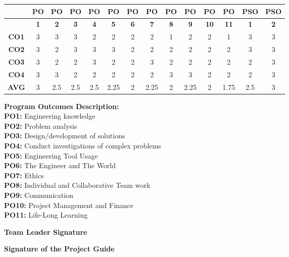 \documentclass[12pt,a4paper]{report}
\begin{document}
\clearpage
\thispagestyle{mainstyle}


\vspace{0.45cm}
\begin{center}
\renewcommand{\arraystretch}{1.25}
\setlength{\tabcolsep}{5pt}
\begin{tabular}{|c|*{11}{c|}c|c|}
\hline
 & \textbf{PO} & \textbf{PO} & \textbf{PO} & \textbf{PO} & \textbf{PO} & \textbf{PO} & \textbf{PO} & \textbf{PO} & \textbf{PO} & \textbf{PO} & \textbf{PO} & \textbf{PSO} & \textbf{PSO} \\
\hline
 & \textbf{1} & \textbf{2} & \textbf{3} & \textbf{4} & \textbf{5} & \textbf{6} & \textbf{7} & \textbf{8} & \textbf{9} & \textbf{10} & \textbf{11} & \textbf{1} & \textbf{2} \\
\hline
\textbf{CO1} & 3 & 3 & 3 & 2 & 2 & 2 & 2 & 1 & 2 & 2 & 1 & 3 & 3 \\
\hline
\textbf{CO2} & 3 & 2 & 3 & 3 & 3 & 2 & 2 & 2 & 2 & 2 & 2 & 3 & 3 \\
\hline
\textbf{CO3} & 3 & 2 & 2 & 3 & 2 & 2 & 3 & 2 & 2 & 2 & 2 & 2 & 3 \\
\hline
\textbf{CO4} & 3 & 3 & 2 & 2 & 2 & 2 & 2 & 3 & 3 & 2 & 2 & 2 & 3 \\
\hline
\textbf{AVG} & 3 & 2.5 & 2.5 & 2.5 & 2.25 & 2 & 2.25 & 2 & 2.25 & 2 & 1.75 & 2.5 & 3 \\
\hline
\end{tabular}
\end{center}

\vspace{1.1cm}
\noindent\textbf{Program Outcomes Description:}\\[0.25cm]
\textbf{PO1:} Engineering knowledge\\
\textbf{PO2:} Problem analysis\\
\textbf{PO3:} Design/development of solutions\\
\textbf{PO4:} Conduct investigations of complex problems\\
\textbf{PO5:} Engineering Tool Usage\\
\textbf{PO6:} The Engineer and The World\\
\textbf{PO7:} Ethics\\
\textbf{PO8:} Individual and Collaborative Team work\\
\textbf{PO9:} Communication\\
\textbf{PO10:} Project Management and Finance\\
\textbf{PO11:} Life-Long Learning

\vspace{2.0cm}
\begin{minipage}[t]{0.45\textwidth}
\raggedright
\textbf{Team Leader Signature}
\end{minipage}
\hfill
\begin{minipage}[t]{0.45\textwidth}
\raggedleft
\textbf{Signature of the Project Guide}
\end{minipage}
\end{document}
